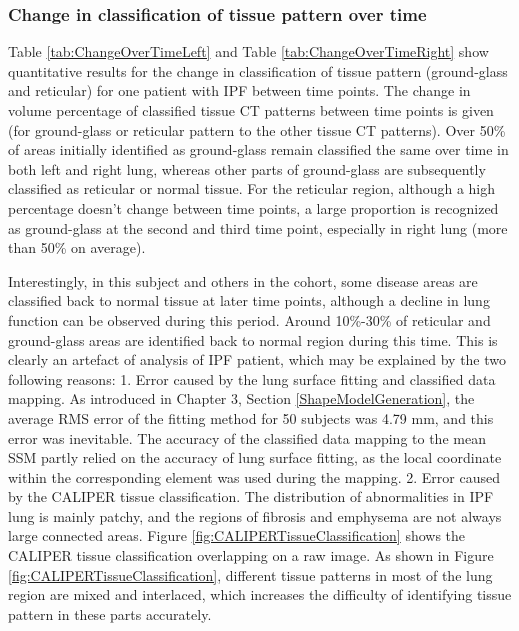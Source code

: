 \subsubsection{Change in classification of tissue pattern over time} \label{TissueClassificationChangeOverTime}
Table \ref{tab:ChangeOverTimeLeft} and Table \ref{tab:ChangeOverTimeRight} show quantitative results for the change in classification of tissue pattern (ground-glass and reticular) for one patient with IPF between time points. The change in volume percentage of classified tissue CT patterns between time points is given (for ground-glass or reticular pattern to the other tissue CT patterns). Over 50\% of areas initially identified as ground-glass remain classified the same over time in both left and right lung, whereas other parts of ground-glass are subsequently classified as reticular or normal tissue. For the reticular region, although a high percentage doesn't change between time points, a large proportion is recognized as ground-glass at the second and third time point, especially in right lung (more than 50\% on average). 

Interestingly, in this subject and others in the cohort, some disease areas are classified back to normal tissue at later time points, although a decline in lung function can be observed during this period. Around 10\%-30\% of reticular and ground-glass areas are identified back to normal region during this time. This is clearly an artefact of analysis of IPF patient, which may be explained by the two following reasons: 1. Error caused by the lung surface fitting and classified data mapping. As introduced in Chapter 3, Section \ref{ShapeModelGeneration}, the average RMS error of the fitting method for 50 subjects was 4.79 mm, and this error was inevitable. The accuracy of the classified data mapping to the mean SSM partly relied on the accuracy of lung surface fitting, as the local coordinate within the corresponding element was used during the mapping. 2. Error caused by the CALIPER tissue classification. The distribution of abnormalities in IPF lung is mainly patchy, and the regions of fibrosis and emphysema are not always large connected areas. Figure \ref{fig:CALIPERTissueClassification} shows the CALIPER tissue classification overlapping on a raw image. As shown in Figure \ref{fig:CALIPERTissueClassification}, different tissue patterns in most of the lung region are mixed and interlaced, which increases the difficulty of identifying tissue pattern in these parts accurately.

